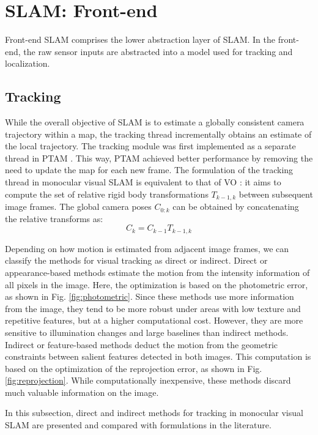 \section{SLAM: Front-end}
\label{sec:frontend}
Front-end SLAM comprises the lower abstraction layer of SLAM. In the front-end, the raw sensor inputs are abstracted into a model used for tracking and localization.

\subsection{Tracking}
\label{sec:frontend:tracking}
While the overall objective of SLAM is to estimate a globally consistent camera trajectory within a map, the tracking thread incrementally obtains an estimate of the local trajectory.
The tracking module was first implemented as a separate thread in \ac{PTAM} \cite{klein2007ptam}. This way, \ac{PTAM} achieved better performance by removing the need to update the map for each new frame.
The formulation of the tracking thread in monocular visual SLAM is equivalent to that of \ac{VO} \cite{nister2004visual}: it aims to compute the set of relative rigid body transformations $T_{k-1, k}$ between subsequent image frames. 
The global camera poses $C_{0:k}$ can be obtained by concatenating the relative transforms as:
\begin{equation}
    C_{k} = C_{k-1}T_{k-1, k}
\end{equation}

Depending on how motion is estimated from adjacent image frames, we can classify the methods for visual tracking as direct or indirect.
Direct or appearance-based methods estimate the motion from the intensity information of all pixels in the image. Here, the optimization is based on the photometric error, as shown in Fig. \ref{fig:photometric}. Since these methods use more information from the image, they tend to be more robust under areas with low texture and repetitive features, but at a higher computational cost. However, they are more sensitive to illumination changes and large baselines than indirect methods.
Indirect or feature-based methods deduct the motion from the geometric constraints between salient features detected in both images. This computation is based on the optimization of the reprojection error, as shown in Fig. \ref{fig:reprojection}. While computationally inexpensive, these methods discard much valuable information on the image.


In this subsection, direct and indirect methods for tracking in monocular visual SLAM are presented and compared with formulations in the literature.


